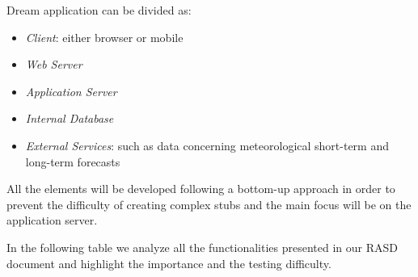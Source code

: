 \documentclass{article}
\begin{document}
    Dream application can be divided as:
    
    \begin{itemize}
        \item \textit{Client}: either browser or mobile 
        \item \textit{Web Server}
        \item \textit{Application Server}
        \item \textit{Internal Database}
        \item \textit{External Services}: such as data concerning meteorological short-term and long-term forecasts
    \end{itemize}
    
    \setlength{\parskip}{1em}

    All the elements will be developed following a bottom-up approach in order to prevent the difficulty of creating complex stubs and the main focus will be on the application server. \par
    
    In the following table we analyze all the functionalities presented in our RASD document and highlight the importance and the testing difficulty. \par
    
    
    
    
    
\end{document}
